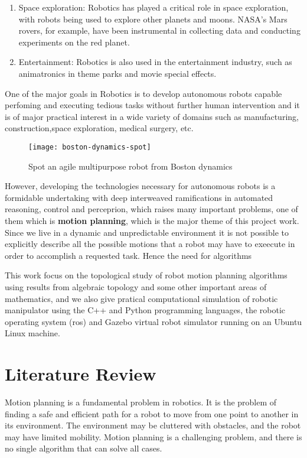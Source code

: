 \begin{enumerate}
    \item Space exploration: Robotics has played a critical role in space exploration, with robots being used to explore other planets and moons. NASA's Mars rovers, for example, have been instrumental in collecting data and conducting experiments on the red planet.
    
    

    \item Entertainment: Robotics is also used in the entertainment industry, such as animatronics in theme parks and movie special effects.
\end{enumerate}

One of the major goals in Robotics is to develop autonomous robots capable perfoming and executing tedious tasks without further human intervention and it is of major practical interest in a wide variety of domains such as manufacturing, construction,space exploration, medical surgery, etc.
\begin{figure}[H]
    \centering
    \texttt{[image: boston-dynamics-spot]}
    \caption{Spot an agile multipurpose robot from Boston dynamics} 
\end{figure}
However, developing the technologies necessary for autonomous robots is a formidable undertaking with deep interweaved ramifications in automated reasoning, control and perceprion, which raises many important problems, one of them which is \textbf{motion planning}, which is the major theme of this project work. Since we live in a dynamic and unpredictable environment it is not possible to explicitly describe all the possible motions that a robot may have to exeecute in order to accomplish a requested task. Hence the need for algorithms 

This work focus on the topological study of robot motion planning algorithms using results from algebraic topology and some other important areas of mathematics, and we also give pratical computational simulation of robotic manipulator using the C++ and Python programming languages, the robotic operating system (ros) and Gazebo virtual robot simulator running on an Ubuntu Linux machine.

\section{Literature Review}
Motion planning is a fundamental problem in robotics. It is the problem of finding a safe and efficient path for a robot to move from one point to another in its environment. The environment may be cluttered with obstacles, and the robot may have limited mobility. Motion planning is a challenging problem, and there is no single algorithm that can solve all cases.

